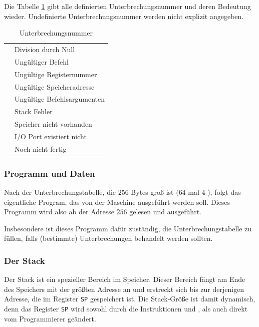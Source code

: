 Die Tabelle \ref{tab:Unterbrechungstabelle} gibt alle definierten
Unterbrechungsnummer und deren Bedeutung wieder. Undefinierte
Unterbrechungsnummer werden nicht explizit angegeben.


\begin{longtable}{>{\ttfamily}ll}
\caption{Unterbrechungsnummer}
\label{tab:Unterbrechungstabelle}
\\\toprule
      & Division durch Null \\
      & Ungültiger Befehl \\
      & Ungültige Registernummer  \\
      & Ungültige Speicheradresse \\
      & Ungültige Befehlsargumenten \\
      & Stack Fehler \\
      & Speicher nicht vorhanden \\
      & I/O Port existiert nicht \\
 99   & Noch nicht fertig \\
\bottomrule
\end{longtable}


\subsubsection{Programm und Daten}

Nach der Unterbrechungstabelle, die $256$ Bytes groß ist ($64$ mal $4$ ),
folgt das eigentliche Program, das von der Maschine ausgeführt werden soll.
Dieses Programm wird also ab der Adresse $256$ gelesen und ausgeführt.

Insbesondere ist dieses Programm dafür zuständig, die Unterbrechungstabelle zu
füllen, falls (bestimmte) Unterbrechungen behandelt werden sollten.



\subsubsection{Der Stack}
\label{subsubsec:Stack}

Der Stack ist ein spezieller Bereich im Speicher. Dieser Bereich fängt am Ende
des Speichers mit der größten Adresse an und erstreckt sich bis zur derjenigen
Adresse, die im Register \texttt{SP} gespeichert ist. Die Stack-Größe ist damit
dynamisch, denn das Register \texttt{SP} wird sowohl durch die Instruktionen
 und , als auch direkt vom Programmierer geändert.


